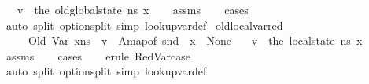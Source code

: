 \begin{isabellebody}
\ \ \ {\isachardoublequoteopen}v\ {\isacharequal}{\kern0pt}\ the\ {\isacharparenleft}{\kern0pt}old{\isacharunderscore}{\kern0pt}global{\isacharunderscore}{\kern0pt}state\ ns\ x{\isacharparenright}{\kern0pt}{\isachardoublequoteclose}\isanewline
%
\isadelimproof
\ \ %
\endisadelimproof
%
\isatagproof
{}\isamarkupfalse%
\ assms\isanewline
\ \ \isamarkupfalse%
\ cases\isanewline
\ \ \isamarkupfalse%
\ {\isacharparenleft}{\kern0pt}auto\ split{\isacharcolon}{\kern0pt}\ option{\isachardot}{\kern0pt}split\ simp{\isacharcolon}{\kern0pt}\ lookup{\isacharunderscore}{\kern0pt}var{\isacharunderscore}{\kern0pt}def{\isacharparenright}{\kern0pt}%
\endisatagproof
{\isafoldproof}%
%
\isadelimproof
\isanewline
%
\endisadelimproof
\isanewline
{}\isamarkupfalse%
\ old{\isacharunderscore}{\kern0pt}local{\isacharunderscore}{\kern0pt}var{\isacharunderscore}{\kern0pt}red{\isacharunderscore}{\kern0pt}{}{\isacharcolon}{\kern0pt}\isanewline
\ \ \ {\isachardoublequoteopen}{\isasymLambda}{\isacharcomma}{\kern0pt}{\isasymGamma}{\isacharcomma}{\kern0pt}{\isasymOmega}\ {\isasymturnstile}\ {\isasymlangle}Old\ {\isacharparenleft}{\kern0pt}Var\ x{\isacharparenright}{\kern0pt}{\isacharcomma}{\kern0pt}ns{\isasymrangle}\ {\isasymDown}\ v{\isachardoublequoteclose}\ \ A{}{\isacharcolon}{\kern0pt}{\isachardoublequoteopen}map{\isacharunderscore}{\kern0pt}of\ {\isacharparenleft}{\kern0pt}snd\ {\isasymLambda}{\isacharparenright}{\kern0pt}\ x\ {\isasymnoteq}\ None{\isachardoublequoteclose}\isanewline
\ \ \ {\isachardoublequoteopen}v\ {\isacharequal}{\kern0pt}\ the\ {\isacharparenleft}{\kern0pt}local{\isacharunderscore}{\kern0pt}state\ ns\ x{\isacharparenright}{\kern0pt}{\isachardoublequoteclose}\isanewline
%
\isadelimproof
\ \ %
\endisadelimproof
%
\isatagproof
{}\isamarkupfalse%
\ assms\isanewline
\ \ \isamarkupfalse%
\ cases\isanewline
\ \ \isamarkupfalse%
\ {\isacharparenleft}{\kern0pt}erule\ RedVar{\isacharunderscore}{\kern0pt}case{\isacharparenright}{\kern0pt}\isanewline
\ \ \isamarkupfalse%
\ {\isacharparenleft}{\kern0pt}auto\ split{\isacharcolon}{\kern0pt}\ option{\isachardot}{\kern0pt}split\ simp{\isacharcolon}{\kern0pt}\ lookup{\isacharunderscore}{\kern0pt}var{\isacharunderscore}{\kern0pt}def{\isacharparenright}{\kern0pt}%
\endisatagproof
{\isafoldproof}%
%
\isadelimproof
\isanewline
%
\endisadelimproof
\isanewline
{}\isamarkupfalse%

\end{isabellebody}
